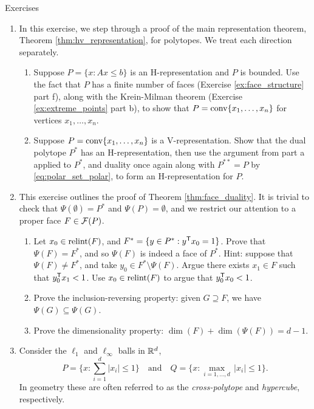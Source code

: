 \begin{xcb}{Exercises}
\begin{enumerate}[label=\thechapter.\arabic*]
\item \label{ex:hv_representation_dual}
  In this exercise, we step through a proof of the main representation theorem,
  Theorem \ref{thm:hv_representation}, for polytopes. We treat each direction 
  separately. 

\begin{enumerate}[label=\alph*.]
\item Suppose $P = \{x : Ax \leq b\}$ is an H-representation and $P$ is
  bounded. Use the fact that $P$ has a finite number of faces (Exercise
  \ref{ex:face_structure} part f), along with the Krein-Milman theorem
  (Exercise \ref{ex:extreme_points} part b), to show that $P =
  \operatorname{conv}\{x_1,\dots,x_n\}$ for vertices $x_1,\dots,x_n$.

\item Suppose $P = \operatorname{conv}\{x_1,\dots,x_n\}$ is a V-representation. Show that the
  dual polytope $P^*$ has an H-representation, then use the argument from part a
  applied to $P^*$, and duality once again along with $P^{**} = P$ by
  \eqref{eq:polar_set_polar}, to form an H-representation for $P$.    
\end{enumerate}

\item \label{ex:face_duality}
  This exercise outlines the proof of Theorem \ref{thm:face_duality}. It is
  trivial to check that $\Psi(\emptyset) = P^*$ and $\Psi(P) = \emptyset$, and
  we restrict our attention to a proper face $F \in \mathcal{F}(P)$.  

\begin{enumerate}[label=\alph*.]
\item Let $x_0 \in \operatorname{relint}(F)$, and $F^* = \{ y \in P^* : y^{\mathsf{T}} x_0 = 1 \}$.
  Prove that $\Psi(F) = F^*$, and so $\Psi(F)$ is indeed a face of
  $P^*$. Hint: suppose that $\Psi(F) \not= F^*$, and take $y_0 \in F^* \setminus
  \Psi(F)$. Argue there exists $x_1 \in F$ such that $y_0^{\mathsf{T}} x_1 < 1$. Use $x_0
  \in \operatorname{relint}(F)$ to argue that $y_0^{\mathsf{T}} x_0 < 1$. 

\item Prove the inclusion-reversing property: given $G \supseteq F$, we have
  $\Psi(G) \subseteq \Psi(G)$.  

\item Prove the dimensionality property: $\dim(F) + \dim(\Psi(F)) = d-1$.  
\end{enumerate}

\item \label{ex:l1_linf_ball_duality}
  Consider the $\ell_1$ and $\ell_\infty$ balls in $\mathbb{R}^d$,
  \[
  P = \bigg\{ x : \sum_{i=1}^d |x_i| \leq 1 \bigg\} \quad \text{and} \quad 
  Q = \bigg\{ x : \max_{i=1,\dots,d} \, |x_i| \leq 1 \bigg\}. 
  \]
  In geometry these are often referred to as the \emph{cross-polytope} and
  \emph{hypercube}, respectively.  


\end{enumerate}
\end{xcb}
